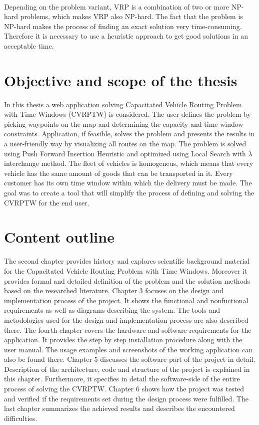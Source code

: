 \documentclass[a4paper,twoside,12pt]{book}
\begin{document}
\paragraph{}
Depending on the problem variant, VRP is a combination of two or more NP-hard problems, which makes VRP also NP-hard. The fact that the problem is NP-hard makes the process of finding an exact solution very time-consuming. Therefore it is necessary to use a heuristic approach to get good solutions in an acceptable time.
\section{Objective and scope of the thesis}
In this thesis a web application solving Capacitated Vehicle Routing Problem with Time Windows (CVRPTW) is considered. The user defines the problem by picking waypoints on the map and determining the capacity and time window constraints. Application, if feasible, solves the problem and presents the results in a user-friendly way by visualizing all routes on the map.
The problem is solved using Push Forward Insertion Heuristic and optimized using Local Search with {$\lambda$} interchange method. 
The fleet of vehicles is homogeneus, which means that every vehicle has the same amount of goods that can be transported in it. Every customer has its own time window within which the delivery must be made.
The goal was to create a tool that will simplify the process of defining and solving the CVRPTW for the end user.


\section{Content outline}
 The second chapter provides history and explores scientific background material for the Capacitated Vehicle Routing Problem with Time Windows. Moreover it provides formal and detailed definition of the problem and the solution methods based on the researched literature. Chapter 3 focuses on the design and implementation process of the project. It shows the functional and nonfuctional requirements as well as diagrams describing the system. The tools and metodologies used for the design and implementation process are also described there. The fourth chapter covers the hardware and software requirements for the application. It provides the step by step installation procedure along with the user manual. The usage examples and screenshots of the working application can also be found there. Chapter 5 discusses the software part of the project in detail. Description of the architecture, code and structure of the project is explained in this chapter. Furthermore, it specifies in detail the software-side of the entire process of solving the CVRPTW. Chapter 6 shows how the project was tested and verified if the requirements set during the design process were fulfilled. The last chapter summarizes the achieved results and describes the encountered difficulties.
\end{document}
